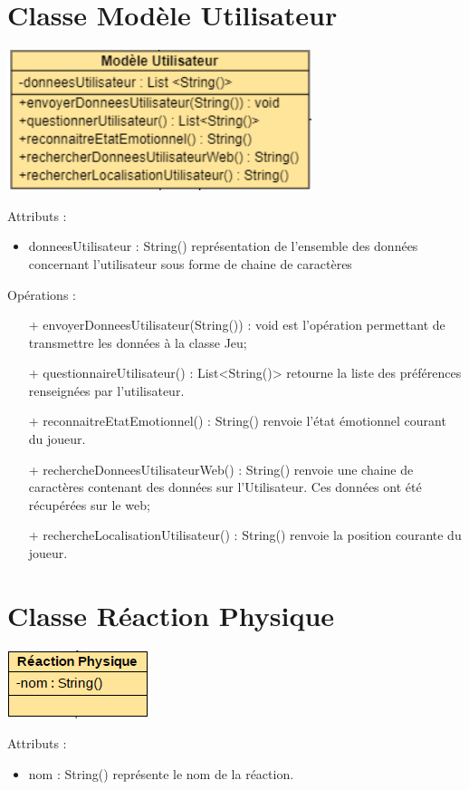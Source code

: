 \documentclass{article}
\begin{document}
	\section{Classe Modèle Utilisateur}
		\begin{center}
			\includegraphics[scale=0.5]{include/Classe_Modele_Utilisateur.PNG}\newline
		\end{center}
		Attributs :
		\begin{itemize}
			\item donneesUtilisateur : String() représentation de l’ensemble des données
			concernant l’utilisateur sous forme de chaine de caractères
		\end{itemize}
		\medskip
		Opérations :
		\begin{itemize}
			\item[+] envoyerDonneesUtilisateur(String()) : void est l’opération permettant de transmettre les données à la classe Jeu;
			\item[+] questionnaireUtilisateur() : List<String()> retourne la liste des préférences renseignées par l'utilisateur.
			\item[+] reconnaitreEtatEmotionnel() : String() renvoie l'état émotionnel courant du joueur.
			\item[+] rechercheDonneesUtilisateurWeb() : String() renvoie une chaine de caractères contenant des données sur l'Utilisateur. Ces données ont été récupérées sur le web;
			\item[+] rechercheLocalisationUtilisateur() : String() renvoie la position courante du joueur. 
		\end{itemize}

	\section{Classe Réaction Physique}
		\begin{center}
			\includegraphics[scale=0.5]{include/Classe_Reaction_Physique.PNG}\newline
		\end{center}
		Attributs :
		\begin{itemize}
			\item nom : String() représente le nom de la réaction.
		\end{itemize}
\end{document}
